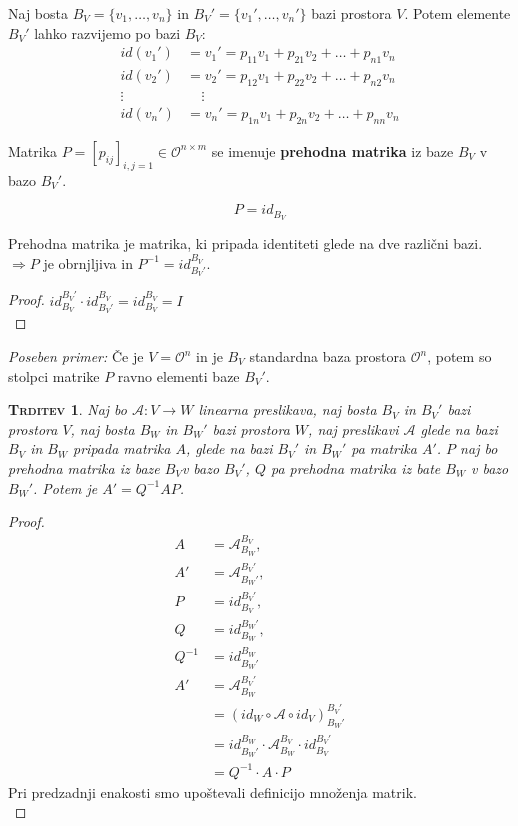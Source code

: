 \documentclass[a4paper,12pt]{article}
\newcommand{\A}{\mathcal{A}}
\newcommand{\OO}{\mathcal{O}}
\newtheorem*{trditev}{\textsc{Trditev}}
\begin{document}
Naj bosta $B_V=\{v_1,\ldots,v_n\}$ in $B_V'=\{v_1',\ldots,v_n'\}$ bazi prostora $V$. Potem elemente $B_V'$ lahko razvijemo po bazi $B_V$:
\begin{align*}
	id(v_1')&=v_1'=p_{11}v_1+p_{21}v_2+\ldots+p_{n1}v_n \\
	id(v_2')&=v_2'=p_{12}v_1+p_{22}v_2+\ldots+p_{n2}v_n \\
	\vdots & ~~~~~ \vdots \\
	id(v_n')&=v_n'=p_{1n}v_1+p_{2n}v_2+\ldots+p_{nn}v_n
\end{align*} 

Matrika $P=[p_{ij}]_{i,j=1}\in \OO^{n\times m}$ se imenuje \textbf{prehodna matrika} iz baze $B_V$ v bazo $B_V'$.

$$ P=id_{B_V} $$ 

Prehodna matrika je matrika, ki pripada identiteti glede na dve različni bazi. \\

$\Rightarrow P$ je obrnjljiva in $P^{-1}=id_{B_V'}^{B_V}$. \\

\begin{proof}
	$id_{B_V}^{B_V'}\cdot id_{B_V'}^{B_V}=id_{B_V}^{B_V}=I$ \\
\end{proof}

\textit{Poseben primer:} Če je $V=\OO^n$ in je $B_V$ standardna baza prostora $\OO^n$, potem so stolpci matrike $P$ ravno elementi baze $B_V'$. \\

\begin{trditev}
	Naj bo $\A:V\to W$ linearna preslikava, naj bosta $B_V$ in $B_V'$ bazi prostora $V$, naj bosta $B_W$ in $B_W'$ bazi prostora $W$, naj preslikavi $\A$ glede na bazi $B_V$ in $B_W$ pripada matrika $A$, glede na bazi $B_V'$ in $B_W'$ pa matrika $A'$. $P$ naj bo prehodna matrika iz baze $B_V$v bazo $B_V'$, $Q$ pa prehodna matrika iz bate $B_W$ v bazo $B_W'$. Potem je $A'=Q^{-1}AP$. \\
\end{trditev}

\begin{proof}
	\begin{align*}
		A&=\A_{B_W}^{B_V}, \\
		A'&=\A_{B_W'}^{B_V'}, \\
		P&=id_{B_V}^{B_V'}, \\
		Q&=id_{B_W}^{B_W'}, \\
		Q^{-1}&=id_{B_W'}^{B_W} \\
		A'&=\A_{B_W}^{B_V'}\\
		&=(id_W\circ \A \circ id_V)_{B_W'}^{B_V'} \\
		&= id_{B_W'}^{B_W}\cdot \A_{B_W}^{B_V}\cdot id_{B_V}^{B_V'} \\
		&= Q^{-1}\cdot A \cdot P 
	\end{align*}
	Pri predzadnji enakosti smo upoštevali definicijo množenja matrik. \\
\end{proof}
\end{document}
